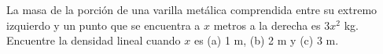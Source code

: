 \item La masa de la porción de una varilla metálica comprendida entre su extremo izquierdo y un punto que se encuentra a $x$ metros a la derecha es $3x^2$ kg. Encuentre la densidad lineal cuando $x$ es (a) 1 m, (b) 2 m y (c) 3 m.
